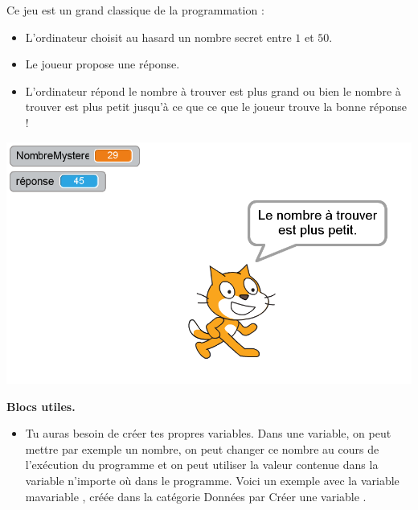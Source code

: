 \documentclass[class=report,crop=false, 12pt]{standalone}
\begin{document}





\bigskip
\bigskip


\begin{activite}
Ce jeu est un grand classique de la programmation :
\begin{itemize}
  \item L'ordinateur choisit au hasard un nombre secret entre $1$ et $50$.
  \item Le joueur propose une réponse.  
  \item L'ordinateur répond \og le nombre à trouver est plus grand \fg{} ou bien \og le nombre à trouver est plus petit \fg{} jusqu'à ce que ce que le joueur trouve la bonne réponse !
\end{itemize}

\begin{center}
  \includegraphics[scale=\scaleecran]{ecran-06-ex1} 
\end{center}


\bigskip

\textbf{Blocs utiles.}

\begin{itemize}
  \item Tu auras besoin de créer tes propres variables. Dans une variable, on peut mettre par exemple un nombre, on peut changer ce nombre au cours de l'exécution du programme et on peut utiliser la valeur contenue dans la variable n'importe où dans le programme. Voici un exemple avec la variable \og mavariable \fg{}, créée dans la catégorie \og Données \fg{} par \og Créer une variable \fg{}.
  

\end{itemize}
\end{activite}
\end{document}

